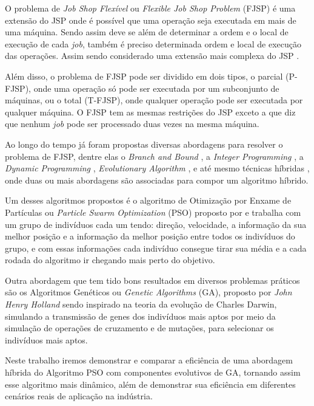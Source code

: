     O problema de \textit{Job Shop Flexível} ou \textit{Flexible Job Shop Problem} (FJSP) é uma extensão do JSP onde é possível que uma operação seja executada em mais de uma máquina. Sendo assim deve se além de determinar a ordem e o local de execução de cada \textit{job}, também é preciso determinada ordem e local de execução das operações. Assim sendo considerado uma extensão mais complexa do JSP \cite{Jansen2000}.\newline

    Além disso, o problema de FJSP pode ser dividido em dois tipos, o parcial (P-FJSP), onde uma operação só pode ser executada por um subconjunto de máquinas, ou o total (T-FJSP), onde qualquer operação pode ser executada por qualquer máquina. O FJSP tem as mesmas restrições do JSP exceto a que diz que nenhum \textit{job} pode ser processado duas vezes na mesma máquina.\newline

    Ao longo do tempo já foram propostas diversas abordagens para resolver o problema de FJSP, dentre elas o \textit{Branch and Bound} \cite{Nababan2008}, a 
    \textit{Integer Programming} \cite{Pan2007}, a 
    \textit{Dynamic Programming} \cite{Gromicho2012}, 
    \textit{Evolutionary Algorithm} \cite{Pezzella2008}, e até mesmo técnicas híbridas \cite{Zhang2009}, onde duas ou mais abordagens são associadas para compor um algoritmo híbrido.\newline

    Um desses algoritmos propostos é o algoritmo de Otimização por Enxame de Partículas ou \textit{Particle Swarm Optimization} (PSO) proposto por \cite{Kennedy1995} e trabalha com um grupo de indivíduos cada um tendo: direção, velocidade, a informação da sua melhor posição e a informação da melhor posição entre todos os indivíduos do grupo, e com essas informações cada indivíduo consegue tirar sua média e a cada rodada do algoritmo ir chegando mais perto do objetivo.\newline

    Outra abordagem que tem tido bons resultados em diversos problemas práticos \cite{Qing2012} são os Algoritmos Genéticos ou \textit{Genetic Algorithms} (GA), proposto por \textit{John Henry Holland} sendo inspirado na teoria da evolução de Charles Darwin, simulando a transmissão de genes dos indivíduos mais aptos por meio da simulação de operações de cruzamento e de mutações, para selecionar os indivíduos mais aptos.\newline

    Neste trabalho iremos demonstrar e comparar a eficiência de uma abordagem híbrida do Algoritmo PSO com componentes evolutivos de GA, tornando assim esse algoritmo mais dinâmico, além de demonstrar sua eficiência em diferentes cenários reais de aplicação na indústria.\newline


